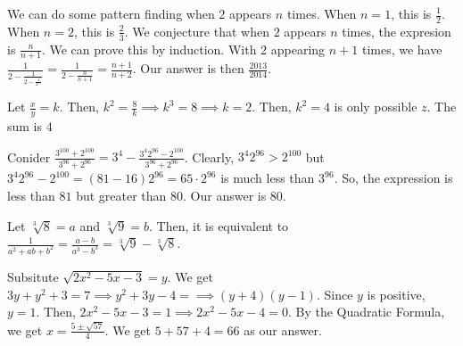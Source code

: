 \documentclass[11pt]{article}
\begin{document}


\begin{sol}
We can do some pattern finding when $2$ appears $n$ times. When $n=1$, this is $\frac{1}{2}$. When $n=2$, this is $\frac{2}{3}$. We conjecture that when $2$ appears $n$ times, the expresion is $\frac{n}{n+1}$. We can prove this by induction. With $2$ appearing $n+1$ times, we have $\frac{1}{2-\frac{1}{2-\frac{1}{2\cdots}}} = \frac{1}{2-\frac{n}{n+1}}=\frac{n+1}{n+2}$. Our answer is then $\boxed{\frac{2013}{2014}}$.
\end{sol}


\begin{sol} 
Let $\frac{x}{y}=k$. Then, $k^2=\frac{8}{k}\implies k^3 = 8\implies k =2$. Then, $k^2=4$ is only possible $z$. The sum is $\boxed{4}$ 
\end{sol}


\begin{sol}
Conider $\frac{3^{100}+2^{100}}{3^{96}+2^{96}}=3^4-\frac{3^{4}2^{96}-2^{100}}{3^{96}+2^{96}}$. Clearly, $3^{4}2^{96}>2^{100}$ but $3^{4}2^{96}-2^{100}=(81-16)2^{96}=65\cdot 2^{96}$ is much less than $3^{96}$. So, the expression is less than $81$ but greater than $80$. Our answer is $\boxed{80}$.
\end{sol}


\begin{sol}
Let $\sqrt[3]{8}=a$ and $\sqrt[3]{9}=b$. Then, it is equivalent to $\frac{1}{a^2+ab+b^2}=\frac{a-b}{a^3-b^3}=\boxed{\sqrt[3]{9}-\sqrt[3]{8}}$.
\end{sol}


\begin{sol}
Subsitute $\sqrt{2x^2-5x-3}=y$. We get $3y+y^2+3=7\implies y^2+3y-4=\implies (y+4)(y-1)$. Since $y$ is positive, $y=1$. Then, $2x^2-5x-3=1\implies 2x^2-5x-4=0$. By the Quadratic Formula, we get $x=\frac{5 \pm \sqrt{57}}{4}$. We get $5+57+4=\boxed{66}$ as our answer.
\end{sol}
\end{document}
